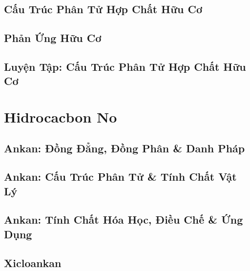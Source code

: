 \documentclass[oneside]{book}
\numberwithin{equation}{section}
\begin{document}

\section{Cấu Trúc Phân Tử Hợp Chất Hữu Cơ}


\section{Phản Ứng Hữu Cơ}


\section{Luyện Tập: Cấu Trúc Phân Tử Hợp Chất Hữu Cơ}


\chapter{Hidrocacbon No}

\section{Ankan: Đồng Đẳng, Đồng Phân \& Danh Pháp}


\section{Ankan: Cấu Trúc Phân Tử \& Tính Chất Vật Lý}


\section{Ankan: Tính Chất Hóa Học, Điều Chế \& Ứng Dụng}


\section{Xicloankan}
\end{document}
